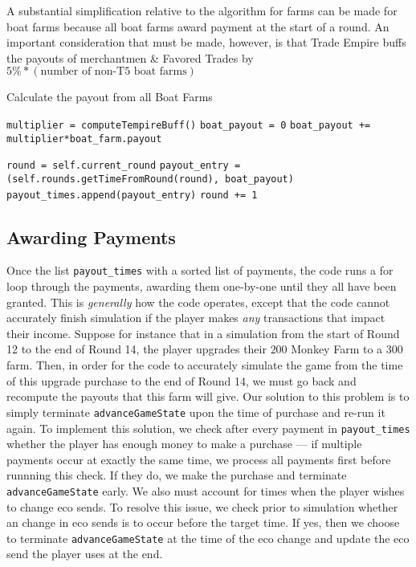 \documentclass[12pt,letterpaper]{article}
\theoremstyle{remark}
\theoremstyle{plain}
\begin{document}
A substantial simplification relative to the algorithm for farms can be made for boat farms because all boat farms award payment at the start of a round. An important consideration that must be made, however, is that Trade Empire buffs the payouts of merchantmen \& Favored Trades by $5\%*(\text{number of non-T5 boat farms})$

\begin{algorithm}
\caption{Calculate the payout from all Boat Farms}
\begin{algorithmic}
\State \texttt{multiplier = computeTempireBuff()}
\State \texttt{boat\_payout = 0}
    \State \texttt{boat\_payout += multiplier*boat\_farm.payout}
\EndFor

\State \texttt{round = self.current\_round}
    \State \texttt{payout\_entry = (self.rounds.getTimeFromRound(round), boat\_payout)}
    \State \texttt{payout\_times.append(payout\_entry)}   
    \State \texttt{round += 1}
\EndWhile
\end{algorithmic}
\end{algorithm}

\subsection{Awarding Payments}\label{awarding payments}

Once the list \texttt{payout\_times} with a sorted list of payments, the code runs a for loop through the payments, awarding them one-by-one until they all have been granted. This is \textit{generally} how the code operates, except that the code cannot accurately finish simulation if the player makes \textit{any} transactions that impact their income. Suppose for instance that in a simulation from the start of Round 12 to the end of Round 14, the player upgrades their $200$ Monkey Farm to a $300$ farm. Then, in order for the code to accurately simulate the game from the time of this upgrade purchase to the end of Round 14, we must go back and recompute the payouts that this farm will give. Our solution to this problem is to simply terminate \texttt{advanceGameState} upon the time of purchase and re-run it again. To implement this solution, we check after every payment in \texttt{payout\_times} whether the player has enough money to make a purchase --- if multiple payments occur at exactly the same time, we process all payments first before runnning this check. If they do, we make the purchase and terminate \texttt{advanceGameState} early. We also must account for times when the player wishes to change eco sends. To resolve this issue, we check prior to simulation whether an change in eco sends is to occur before the target time. If yes, then we choose to terminate \texttt{advanceGameState} at the time of the eco change and update the eco send the player uses at the end.
\end{document}
